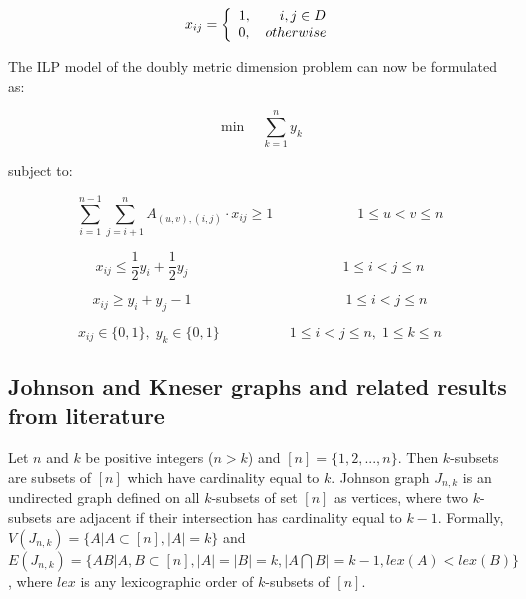 \documentclass[preprint,12pt]{elsarticle}
\begin{document}
\begin{equation} 
x_{ij}  = \left\{ {\begin{array}{*{20}c}
   {1,\quad \quad i,j \in D}  \\
   {0,\quad otherwise}  \\
\end{array}} \right.
\end{equation}

The ILP model of the doubly metric dimension problem can now be formulated as:

\begin{equation} \label{ilpdk}
\min \quad \sum\limits_{k = 1}^n {y_k }
\end{equation}

subject to:

\begin{equation}
\sum\limits_{i = 1}^{n - 1} {\sum\limits_{j = i + 1}^n
{A_{(u,v),(i,j)}  \cdot x_{ij} } }  \ge 1\quad \quad \quad \quad
\quad \quad 1 \le u < v \le n
\end{equation}

\begin{equation}
x_{ij}  \le \frac{1}{2}y_i  + \frac{1}{2}y_j \quad \quad \quad \quad \quad \quad
\quad \quad \quad \quad \quad 1 \le i < j \le n
\end{equation}

\begin{equation}
x_{ij}  \ge y_i  + y_j  - 1\quad \quad \quad \quad \quad \quad \quad \quad \quad
\quad \quad 1 \le i < j \le n
\end{equation}

\begin{equation} \label{ilpdk2}
x_{ij}  \in \{ 0,1\} ,\;y_k  \in \{ 0,1\} \quad \quad \quad \quad
\quad 1 \le i < j \le n,\;1 \le k \le n
\end{equation} 


\subsection{Johnson and Kneser graphs and related results from literature}

Let $n$ and $k$ be positive integers ($n > k$) and $[n] = \{1,2,...,n\}$.
Then $k$-subsets are subsets of $[n]$ which have cardinality equal to $k$.
Johnson graph $J_{n,k}$ is an undirected graph defined on all $k$-subsets of set $[n]$ as vertices,
where two $k$-subsets are adjacent if their intersection has cardinality equal to $k-1$.
Formally, $V(J_{n,k}) = \{ A | A \subset [n], |A|=k\}$ and
$E(J_{n,k}) = \{ AB | A,B \subset [n], |A|=|B|=k, |A \bigcap B|=k-1, lex(A) < lex(B)\}$,
where $lex$ is any lexicographic order of $k$-subsets of $[n]$.
\end{document}

